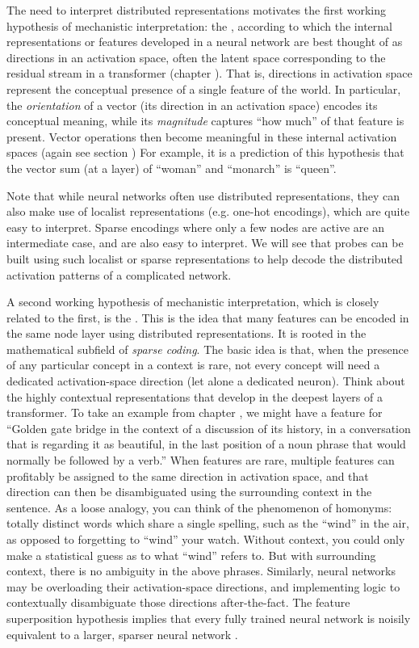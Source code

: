 The need to interpret distributed representations motivates the first working
hypothesis of mechanistic interpretation: the , according to which the internal representations or features
developed in a neural network are best thought of as directions in an
activation space, often the latent space corresponding to the residual stream
in a transformer (chapter ). That is, directions in
activation space represent the conceptual  presence of a single feature of the
world. In particular, the  \emph{orientation} of a vector (its direction in an
activation space) encodes its conceptual meaning, while its \emph{magnitude}
captures ``how much'' of that feature is present. Vector operations then become
meaningful in these internal activation spaces (again see section
)  For example, it is a prediction of this
hypothesis that the vector sum (at a layer) of ``woman'' and ``monarch'' is
``queen''.

Note that while neural networks often use distributed representations, they can
also make use of localist representations (e.g. one-hot encodings), which are
quite easy to interpret. Sparse encodings where only a few nodes are active are
an intermediate case, and are also easy to interpret. We will see that probes
can be built using such localist or sparse representations to help decode the
distributed activation patterns of a complicated network.

A second working hypothesis of mechanistic interpretation, which is closely
related to the first, is the . This
is the idea that many features can be encoded in the same node layer using
distributed representations. It is rooted in the mathematical subfield of
\emph{sparse coding}. The basic idea is that, when the presence of any
particular concept in a context is rare, not every concept will need a
dedicated activation-space direction (let alone a dedicated neuron). Think
about the highly contextual representations that develop in the deepest layers
of a transformer. To take an example from chapter , we
might have a feature for ``Golden gate bridge in the context of a discussion of
its history, in a conversation that is regarding it as beautiful, in the last
position of a noun phrase that would normally be followed by a verb.'' When
features are rare, multiple features can profitably be assigned to the same
direction in activation space, and that direction can then be disambiguated
using the surrounding context in the sentence. As a loose analogy, you can
think of the phenomenon of homonyms: totally distinct words which share a
single spelling, such as the ``wind'' in the air, as opposed to forgetting to
``wind'' your watch. Without context, you could only make a statistical guess
as to what ``wind'' refers to. But with surrounding context, there is no
ambiguity in the above phrases. Similarly, neural networks may be overloading
their activation-space directions, and implementing logic to contextually
disambiguate those directions after-the-fact. The feature superposition
hypothesis implies that every fully trained neural network is noisily
equivalent to a larger, sparser neural network \cite{elhage2022superposition}.


